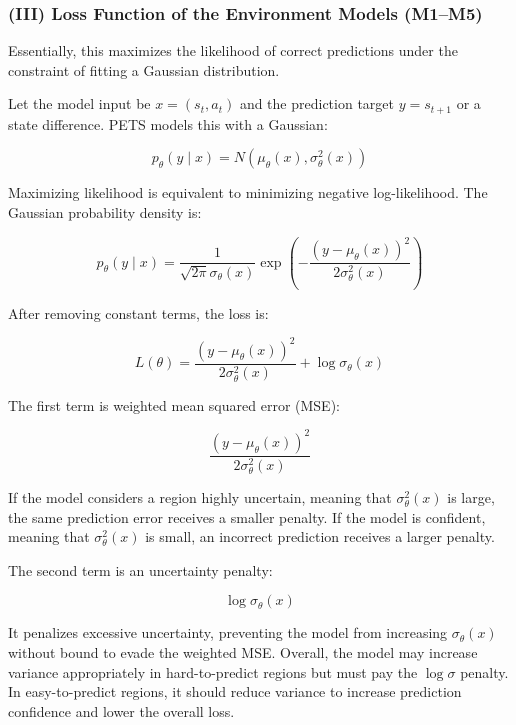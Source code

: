 \hypertarget{iii-loss-function-of-the-environment-models-m1m5}{%
\subsubsection{(III) Loss Function of the Environment Models (M1--M5)}\label{iii-loss-function-of-the-environment-models-m1m5}}

Essentially, this maximizes the likelihood of correct predictions under the constraint of fitting a Gaussian distribution.

Let the model input be \(x=(s_t,a_t)\) and the prediction target \(y=s_{t+1}\) or a state difference. PETS models this with a Gaussian:

\[
p_\theta(y\mid x)=N(\mu_\theta(x),\sigma_\theta^2(x))
\]

Maximizing likelihood is equivalent to minimizing negative log-likelihood. The Gaussian probability density is:

\[
p_\theta(y\mid x)=\frac{1}{\sqrt{2\pi}\sigma_\theta(x)}
\exp\left(-\frac{(y-\mu_\theta(x))^2}{2\sigma_\theta^2(x)}\right)
\]

After removing constant terms, the loss is:

\[
L(\theta)=\frac{(y-\mu_\theta(x))^2}{2\sigma_\theta^2(x)}+\log\sigma_\theta(x)
\]

The first term is weighted mean squared error (MSE):

\[
\frac{(y-\mu_\theta(x))^2}{2\sigma_\theta^2(x)}
\]

If the model considers a region highly uncertain, meaning that \(\sigma_\theta^2(x)\) is large, the same prediction error receives a smaller penalty. If the model is confident, meaning that \(\sigma_\theta^2(x)\) is small, an incorrect prediction receives a larger penalty.

The second term is an uncertainty penalty:

\[
\log\sigma_\theta(x)
\]

It penalizes excessive uncertainty, preventing the model from increasing \(\sigma_\theta(x)\) without bound to evade the weighted MSE. Overall, the model may increase variance appropriately in hard-to-predict regions but must pay the \(\log\sigma\) penalty. In easy-to-predict regions, it should reduce variance to increase prediction confidence and lower the overall loss.

